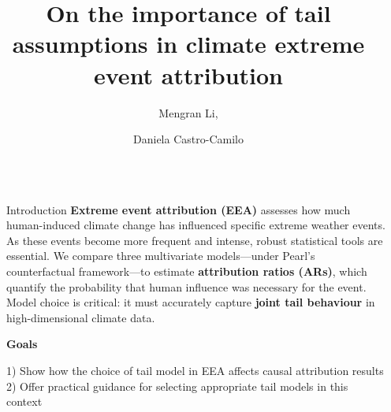 \documentclass[final]{beamer}
\title{On the importance of tail assumptions in climate extreme event attribution}
\author{Mengran Li,\and Daniela Castro-Camilo }
\institute{School of Mathematics and Statistics, University of Glasgow, UK}
\newlength{\sepwidth}
\newlength{\colwidth}
\newcommand{\separatorcolumn}{\begin{column}{\sepwidth}\end{column}}
\begin{document}


\begin{frame}[t]
\begin{columns}[t]
\separatorcolumn

\begin{column}{\colwidth}

  \begin{block}{Introduction}
  \textbf{Extreme event attribution (EEA)} assesses how much human-induced climate change has influenced specific extreme weather events.
As these events become more frequent and intense, robust statistical tools are essential.
We compare three multivariate models—under Pearl’s counterfactual framework—to estimate \textbf{attribution ratios (ARs)}, which quantify the probability that human influence was necessary for the event.
Model choice is critical: it must accurately capture \textbf{joint tail behaviour} in high-dimensional climate data.

\begin{tcolorbox}[colback=cyan!10!white, colframe=cyan!40!black, boxrule=0.5pt, width=18.5cm]
\begin{center}
    \textbf{\Large{Goals}}
\end{center}
1) Show how the choice of tail model in EEA affects causal attribution results\\
2) Offer practical guidance for selecting appropriate tail models in this context
\end{tcolorbox}

\end{block}



\end{column}
\end{columns}
\end{frame}
\end{document}
